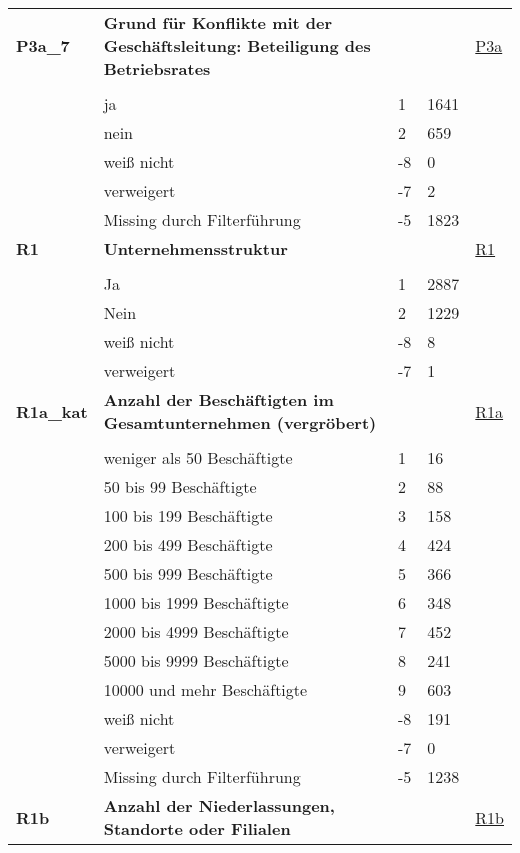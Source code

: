 \begin{longtable}{| L{2.5cm} | L{8.25cm}| C{1.5cm} | R{1.25cm} | C{2.25cm} |  }
   \midrule
\textbf{P3a\_7}\label{var:suf:P3a:7} & \textbf{Grund für Konflikte mit der Geschäftsleitung: Beteiligung des Betriebsrates} &  &  & \hyperref[P3a]{P3a} \\ 
   &  &  &  &  \\ 
   & ja & 1 & 1641 &  \\ 
   & nein & 2 & 659 &  \\ 
   & weiß nicht & -8 & 0 &  \\ 
   & verweigert & -7 & 2 &  \\ 
   & Missing durch Filterführung & -5 & 1823 &  \\ 
   \midrule
\textbf{R1}\label{var:suf:R1} & \textbf{Unternehmensstruktur} &  &  & \hyperref[R1]{R1} \\ 
   &  &  &  &  \\ 
   & Ja & 1 & 2887 &  \\ 
   & Nein & 2 & 1229 &  \\ 
   & weiß nicht & -8 & 8 &  \\ 
   & verweigert & -7 & 1 &  \\ 
   \midrule
\textbf{R1a\_kat}\label{var:suf:R1a:kat} & \textbf{Anzahl der Beschäftigten im Gesamtunternehmen (vergröbert)} &  &  & \hyperref[R1a]{R1a} \\ 
   &  &  &  &  \\ 
   & weniger als 50 Beschäftigte & 1 & 16 &  \\ 
   & 50 bis 99 Beschäftigte & 2 & 88 &  \\ 
   & 100 bis 199 Beschäftigte & 3 & 158 &  \\ 
   & 200 bis 499 Beschäftigte & 4 & 424 &  \\ 
   & 500 bis 999 Beschäftigte & 5 & 366 &  \\ 
   & 1000 bis 1999 Beschäftigte & 6 & 348 &  \\ 
   & 2000 bis 4999 Beschäftigte & 7 & 452 &  \\ 
   & 5000 bis 9999 Beschäftigte & 8 & 241 &  \\ 
   & 10000 und mehr Beschäftigte & 9 & 603 &  \\ 
   & weiß nicht & -8 & 191 &  \\ 
   & verweigert & -7 & 0 &  \\ 
   & Missing durch Filterführung & -5 & 1238 &  \\ 
   \midrule
\textbf{R1b}\label{var:suf:R1b} & \textbf{Anzahl der Niederlassungen, Standorte oder Filialen} &  &  & \hyperref[R1b]{R1b} \\ 

\end{longtable}
